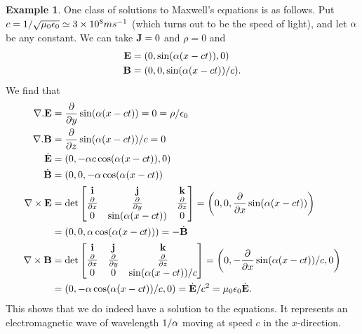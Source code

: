 \documentclass[reqno]{amsart}
\theoremstyle{definition}
\newtheorem{example}[theorem]{Example}
\begin{document}
\begin{example}
 One class of solutions to Maxwell's equations is as follows.  Put
 $c=1/\sqrt{\mu_0\epsilon_0}\simeq 3\times 10^8ms^{-1}$ (which turns out to be
 the speed of light), and let $\alpha$ be any constant.  We can take
 $\mathbf{J}=0$ and $\rho=0$ and
 \begin{align*}
  \mathbf{E} &= (0,\sin(\alpha(x-ct)),0) \\
  \mathbf{B} &= (0,0,\sin(\alpha(x-ct))/c).
 \end{align*}
 We find that
 \begin{align*}
  \nabla.\mathbf{E} &= \frac{\partial}{\partial y}\sin(\alpha(x-ct))
    = 0 = \rho/\epsilon_0 \\
  \nabla.\mathbf{B} &= \frac{\partial}{\partial z}\sin(\alpha(x-ct))/c = 0 \\
  \dot{\mathbf{E}} &= (0,-\alpha c\cos(\alpha(x-ct)),0) \\
  \dot{\mathbf{B}} &= (0,0,-\alpha\cos(\alpha(x-ct)) \\
  \nabla\times\mathbf{E} &= 
   \det\left[\begin{matrix} \mathbf{i} & \mathbf{j} & \mathbf{k} \\
           \frac{\partial}{\partial x} &
           \frac{\partial}{\partial y} &
           \frac{\partial}{\partial z} \\
           0 & \sin(\alpha(x-ct)) & 0 \end{matrix}\right] = 
    \left(0,0,\frac{\partial}{\partial x}\sin(\alpha(x-ct))\right) \\
    &= (0,0,\alpha\cos(\alpha(x-ct))) = -\dot{\mathbf{B}} \\
  \nabla\times\mathbf{B} &= 
   \det\left[\begin{matrix} \mathbf{i} & \mathbf{j} & \mathbf{k} \\
           \frac{\partial}{\partial x} &
           \frac{\partial}{\partial y} &
           \frac{\partial}{\partial z} \\
           0 & 0 & \sin(\alpha(x-ct))/c \end{matrix}\right] = 
    \left(0,-\frac{\partial}{\partial x}\sin(\alpha(x-ct))/c,0\right) \\
    &= (0,-\alpha\cos(\alpha(x-ct))/c,0) = \dot{\mathbf{E}}/c^2=\mu_0\epsilon_0\dot{\mathbf{E}}.
 \end{align*}
 This shows that we do indeed have a solution to the equations.  It
 represents an electromagnetic wave of wavelength $1/\alpha$ moving at
 speed $c$ in the $x$-direction.
\end{example}
\end{document}

